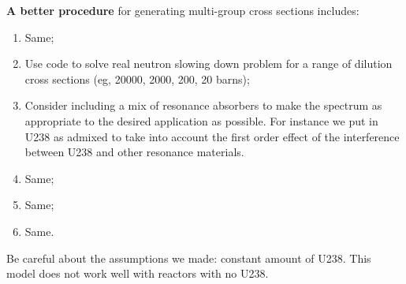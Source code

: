 \documentclass{school-22.211-notes}
\begin{document}
\textbf{A better procedure} for generating multi-group cross sections includes:
\begin{enumerate}
\item Same;
\item Use code to solve real neutron slowing down problem for a range of dilution cross sections (eg, 20000, 2000, 200, 20 barns);
\item Consider including a mix of resonance absorbers to make the spectrum as appropriate to the desired application as possible. For instance we put in U238 as admixed to take into account the first order effect of the interference between U238 and other resonance materials. 
\item Same;
\item Same;
\item Same.
\end{enumerate}
Be careful about the assumptions we made: constant amount of U238. This model does not work well with reactors with no U238. 
\end{document}
